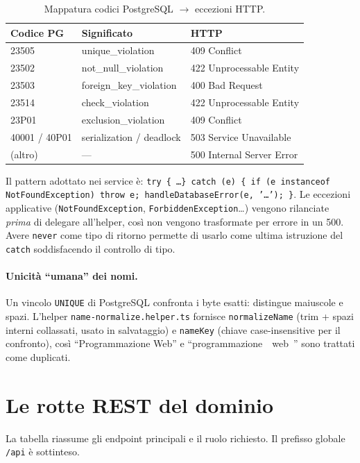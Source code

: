 \documentclass[11pt,a4paper,oneside]{report}
\newcommand{\code}[1]{\texttt{\small #1}}
\newcommand{\file}[1]{\texttt{\small #1}}
\begin{document}
\begin{table}[h]
\centering
\renewcommand{\arraystretch}{1.2}
\begin{tabular}{@{}lll@{}}
\toprule
\textbf{Codice PG} & \textbf{Significato} & \textbf{HTTP} \\
\midrule
23505 & unique\_violation        & 409 Conflict \\
23502 & not\_null\_violation     & 422 Unprocessable Entity \\
23503 & foreign\_key\_violation  & 400 Bad Request \\
23514 & check\_violation         & 422 Unprocessable Entity \\
23P01 & exclusion\_violation     & 409 Conflict \\
40001 / 40P01 & serialization / deadlock & 503 Service Unavailable \\
(altro) & ---                    & 500 Internal Server Error \\
\bottomrule
\end{tabular}
\caption{Mappatura codici PostgreSQL $\rightarrow$ eccezioni HTTP.}
\end{table}

Il pattern adottato nei service è: \code{try \{ \ldots \} catch (e) \{ if (e
instanceof NotFoundException) throw e; handleDatabaseError(e, '\ldots'); \}}.
Le eccezioni applicative (\code{NotFoundException}, \code{ForbiddenException}\ldots)
vengono rilanciate \emph{prima} di delegare all'helper, così non vengono
trasformate per errore in un 500. Avere \code{never} come tipo di ritorno
permette di usarlo come ultima istruzione del \code{catch} soddisfacendo il
controllo di tipo.

\paragraph{Unicità ``umana'' dei nomi.} Un vincolo \code{UNIQUE} di PostgreSQL
confronta i byte esatti: distingue maiuscole e spazi. L'helper
\file{name-normalize.helper.ts} fornisce \code{normalizeName} (trim + spazi
interni collassati, usato in salvataggio) e \code{nameKey} (chiave
case-insensitive per il confronto), così ``Programmazione Web'' e
``programmazione~~web~'' sono trattati come duplicati.

\section{Le rotte REST del dominio}
La tabella riassume gli endpoint principali e il ruolo richiesto. Il prefisso
globale \code{/api} è sottinteso.
\end{document}

